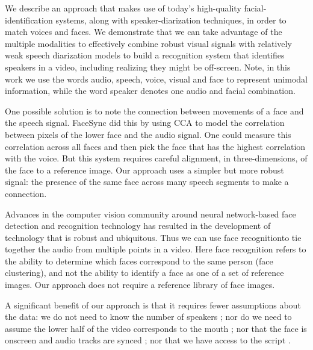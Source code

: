 \documentclass[a4paper]{article}
\begin{document}
We describe an approach that makes use of today's high-quality facial-identification systems, along with speaker-diarization techniques, in order to match voices and faces. We demonstrate that we can take advantage of the multiple modalities to effectively combine robust visual signals with relatively weak speech diarization models to build a recognition system that identifies speakers in a video, including realizing they might be off-screen. Note, in this work we use the words audio, speech, voice, visual and face to represent unimodal information, while the word speaker denotes one audio and facial combination. 

One possible solution is to note the connection between movements of a face and the speech signal. FaceSync \cite{Sla00} did this by using CCA to model the correlation between pixels of the lower face and the audio signal. One could measure this correlation across all faces and then pick the face that has the highest correlation with the voice. But this system requires careful alignment, in three-dimensions, of the face to a reference image. Our approach uses a simpler but more robust signal: the presence of the same face across many speech segments to make a connection.

Advances in the computer vision community around neural network-based face detection and recognition technology has resulted in the development of technology that is robust and ubiquitous. Thus we can use face recognition\footnotemark to tie together the audio from multiple points in a video.
Here face recognition refers to the ability to determine which faces correspond to the same person (face clustering), and not the ability to identify a face as one of a set of reference images. Our approach does not require a reference library of face images.

A significant benefit of our approach is that it requires fewer assumptions about the data: we do not need to know the number of speakers \cite{Shu11}; nor do we need to assume the lower half of the video corresponds to the mouth \cite{Mon11}; nor that the face is onscreen and audio tracks are synced \cite{Hu15}; nor that we have access to the script \cite{Eve06}. 
\end{document}
